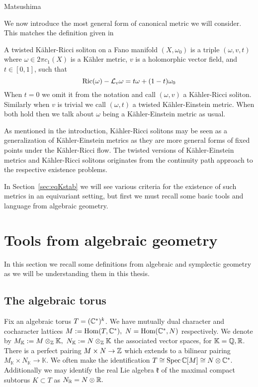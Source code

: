 \begin{theorem}
Matsushima
\end{theorem}
We now introduce the most general form of canonical metric we will consider. This matches the definition given in \cite[Definiton X]{datar2016kahler}
\begin{definition} \label{def:tKRS}
A twisted K\"ahler-Ricci soliton on a Fano manifold \((X,\omega_0)\) is a triple \((\omega,v, t)\) where \(\omega \in 2 \pi c_1(X)\) is a K\"ahler metric, \(v\) is a holomorphic vector field, and \(t \in [0,1]\), such that
\[
\mathop{\rm Ric}\nolimits(\omega) - \mathcal{L}_v \omega = t \omega + (1-t) \omega_0
\]
When \(t = 0\) we omit it from the notation and call \((\omega,v)\) a K\"ahler-Ricci soliton. Similarly when \(v\) is trivial we call \((\omega,t)\) a twisted K\"ahler-Einstein metric. When both hold then we talk about \(\omega\) being a K\"ahler-Einstein metric as usual.
\end{definition}
As mentioned in the introduction, K\"ahler-Ricci solitons may be seen as a generalization of K\"ahler-Einstein metrics as they are more general forms of fixed points under the K\"ahler-Ricci flow. The twisted versions of K\"ahler-Einstein metrics and K\"ahler-Ricci solitons originates from the continuity path approach to the respective existence problems.

In Section~\ref{sec:eqKstab} we will see various criteria for the existence of such metrics in an equivariant setting, but first we must recall some basic tools and language from algebraic geometry.
\section{Tools from algebraic geometry} \label{basics}
In this section we recall some definitions from algebraic and symplectic geometry as we will be understanding them in this thesis.
\subsection{The algebraic torus} \label{algtorus}
Fix an algebraic torus \(T = (\mathbb{C}^*)^k\). We have mutually dual character and cocharacter lattices \(M := \operatorname{Hom}(T,\mathbb{C}^*), \ N = \operatorname{Hom}(\mathbb{C}^*,N)\) respectively. We denote by \(M_\mathbb{K} := M \otimes_\ZZ \mathbb{K}, \ N_\mathbb{K} := N \otimes_\ZZ \mathbb{K} \) the associated vector spaces, for \(\mathbb{K} = \mathbb{Q}, \mathbb{R}\). There is a perfect pairing \(M \times N \to \mathbb{Z}\) which extends to a bilinear pairing \(M_\mathbb{K} \times N_\mathbb{K} \to \mathbb{K}\). We often make the identification \( T \cong \operatorname{Spec} \mathbb{C}[M] \cong N \otimes \mathbb{C}^*. \) Additionally we may identify the real Lie algebra \(\mathfrak{k}\) of the maximal compact subtorus \(K \subset T\) as \( N_{\mathbb{R}} = N \otimes \mathbb{R}.\)
